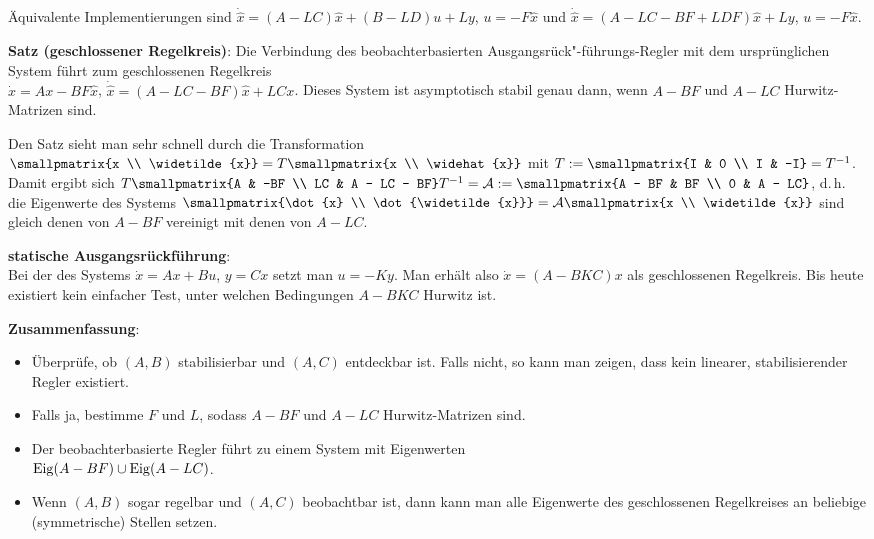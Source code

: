 Äquivalente Implementierungen sind
$\dot{\widehat{x}} = (A - LC) \widehat{x} + (B - LD)u + Ly$, $u = -F\widehat{x}$ und
$\dot{\widehat{x}} = (A - LC - BF + LDF) \widehat{x} + Ly$, $u = -F\widehat{x}$.

\textbf{Satz (geschlossener Regelkreis)}:
Die Verbindung des beobachterbasierten Ausgangsrück"-führungs-Regler mit dem ursprünglichen
System führt zum geschlossenen Regelkreis\\
$\dot{x}  = Ax - BF\widehat{x}$,
$\dot{\widehat{x}} = (A - LC - BF) \widehat{x} + LCx$.
Dieses System ist asymptotisch stabil genau dann, wenn $A - BF$ und $A - LC$ Hurwitz-Matrizen sind.

Den Satz sieht man sehr schnell durch die Transformation
$\smallpmatrix{x \\ \widetilde{x}} = T \smallpmatrix{x \\ \widehat{x}}$ mit
$T := \smallpmatrix{I & 0 \\ I & -I} = T^{-1}$.
Damit ergibt sich $T \smallpmatrix{A & -BF \\ LC & A - LC - BF} T^{-1} = \A
:= \smallpmatrix{A - BF & BF \\ 0 & A - LC}$, d.\,h. die Eigenwerte des Systems
$\smallpmatrix{\dot{x} \\ \dot{\widetilde{x}}} = \A \smallpmatrix{x \\ \widetilde{x}}$
sind gleich denen von $A - BF$ vereinigt mit denen von $A - LC$.

\linie

\textbf{statische Ausgangsrückführung}:\\
Bei der  des Systems
$\dot{x} = Ax + Bu$, $y = Cx$ setzt man $u = -Ky$.
Man erhält also $\dot{x} = (A - BKC)x$ als geschlossenen Regelkreis.
Bis heute existiert kein einfacher Test,
unter welchen Bedingungen $A - BKC$ Hurwitz ist.

\linie

\textbf{Zusammenfassung}:
\begin{itemize}
    \item
    Überprüfe, ob $(A, B)$ stabilisierbar und $(A, C)$ entdeckbar ist.
    Falls nicht, so kann man zeigen, dass kein linearer, stabilisierender Regler existiert.
    
    \item
    Falls ja, bestimme $F$ und $L$, sodass $A - BF$ und $A - LC$ Hurwitz-Matrizen sind.
    
    \item
    Der beobachterbasierte Regler führt zu einem System mit Eigenwerten\\
    $\operatorname{Eig}(A - BF) \cup \operatorname{Eig}(A - LC)$.
    
    \item
    Wenn $(A, B)$ sogar regelbar und $(A, C)$ beobachtbar ist, dann kann man alle Eigenwerte
    des geschlossenen Regelkreises an beliebige (symmetrische) Stellen setzen. 
\end{itemize}

